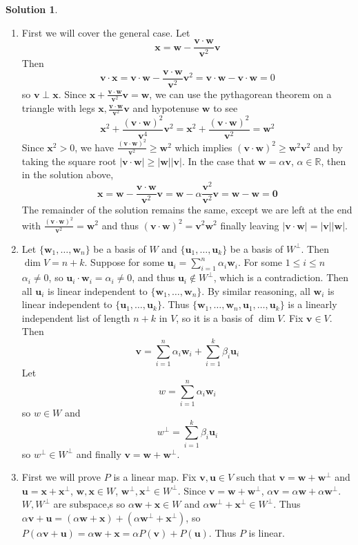 \documentclass[11pt]{article}
\theoremstyle{definition}
\newtheorem*{solution}{Solution}
\newcommand{\R}{\mathbb{R}}
\newcommand{\vv}{\mathbf{v}}
\newcommand{\vu}{\mathbf{u}}
\newcommand{\vw}{\mathbf{w}}
\newcommand{\vx}{\mathbf{x}}
\newcommand{\vzero}{\mathbf{0}}
\begin{document}
    \begin{solution}
        \begin{enumerate}[label = \alph*)]
            \item First we will cover the general case. Let $$\vx = \vw - \frac{\vv \cdot \vw}{\vv^2} \vv$$Then $$\vv \cdot \vx = \vv \cdot \vw - \frac{\vv \cdot \vw}{\vv^2} \vv^2 = \vv \cdot \vw - \vv \cdot \vw =  0$$so $\vv \perp \vx$. Since $\vx + \frac{\vv \cdot \vw}{\vv^2} \vv = \vw$, we can use the pythagorean theorem on a triangle with legs $\vx,  \frac{\vv \cdot \vw}{\vv^2} \vv$ and hypotenuse $\vw$ to see $$\vx^2 + \frac{(\vv \cdot \vw)^2}{\vv^4} \vv^2 = \vx^2 + \frac{(\vv \cdot \vw)^2}{\vv^2}= \vw^2$$Since $\vx^2 > 0$, we have $\frac{(\vv \cdot \vw)^2}{\vv^2} \ge \vw^2$ which implies $(\vv \cdot \vw)^2 \ge \vw^2 \vv^2$ and by taking the square root $|\vv \cdot \vw| \ge |\vw| |\vv|$. In the case that $\vw = \alpha \vv$, $\alpha \in \R$, then in the solution above, $$\vx = \vw - \frac{\vv \cdot \vw}{\vv^2} \vv = \vw - \alpha \frac{\vv^2}{\vv^2} \vv = \vw - \vw = \vzero$$The remainder of the solution remains the same, except we are left at the end with $\frac{(\vv \cdot \vw)^2}{\vv^2}= \vw^2$ and thus $(\vv \cdot \vw)^2 = \vv^2 \vw^2$ finally leaving $|\vv \cdot \vw| = |\vv||\vw|$.
            
            \item Let $\{\vw_1, \dots, \vw_n\}$ be a basis of $W$ and $\{\vu_1, \dots, \vu_k\}$ be a basis of $W^{\perp}$. Then $\dim V = n + k$. Suppose for some $\vu_i = \sum_{i = 1}^n \alpha_i \vw_i$. For some $1 \le i \le n $ $\alpha_i \neq 0$, so $\vu_i \cdot \vw_i = \alpha_i \neq 0$, and thus $\vu_i \not \in W^{\perp}$, which is a contradiction. Then all $\vu_i$ is linear independent to $\{\vw_1, \dots, \vw_n\}$. By similar reasoning, all $\vw_i$ is linear independent to $\{\vu_1, \dots, \vu_k\}$. Thus $\{\vw_1, \dots, \vw_n,\vu_1, \dots, \vu_k \}$ is a linearly independent list of length $n + k$ in $V$, so it is a basis of $\dim V$. Fix $\vv \in V$. Then $$\vv = \sum_{i = 1}^n \alpha_i \vw_i + \sum_{i = 1}^k \beta_i \vu_i$$Let $$w = \sum_{i = 1}^n \alpha_i \vw_i$$so $w \in W$ and$$w^{\perp} = \sum_{i = 1}^k \beta_i \vu_i$$so $w^{\perp} \in W^{\perp}$ and finally $\vv = \vw + \vw^{\perp}$.
            
            \item First we will prove $P$ is a linear map. Fix $\vv, \vu \in V$ such that $\vv = \vw + \vw^{\perp}$ and $\vu = \vx + \vx^{\perp}$, $\vw, \vx \in W$, $\vw^{\perp}, \vx^{\perp} \in W^{\perp}$. Since $\vv = \vw + \vw^{\perp}$, $\alpha\vv = \alpha\vw + \alpha\vw^{\perp}$. $W, W^{\perp}$ are subspace,s so $\alpha\vw + \vx \in W$ and $\alpha\vw^{\perp} + \vx^{\perp} \in W^{\perp}$. Thus $\alpha\vv + \vu = (\alpha\vw + \vx) + (\alpha\vw^{\perp} + \vx^{\perp})$, so $P(\alpha\vv + \vu) = \alpha\vw + \vx = \alpha P(\vv) + P(\vu)$. Thus $P$ is linear. 
            

\end{enumerate}
\end{solution}
\end{document}
